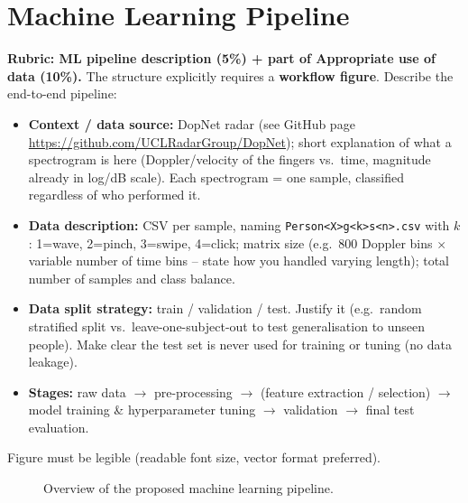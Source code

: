 \documentclass[10pt,a4paper,titlepage]{article}
\newcommand{\placeholder}[1]{\begin{placeholderbox}#1\end{placeholderbox}}
\begin{document}
\section{Machine Learning Pipeline}
\label{sec:pipeline}
\placeholder{%
\textbf{Rubric: ML pipeline description (5\%) + part of Appropriate use of
data (10\%).} The structure explicitly requires a \textbf{workflow figure}.
Describe the end-to-end pipeline:
\begin{itemize}
  \item \textbf{Context / data source:} DopNet radar (see GitHub page
        \url{https://github.com/UCLRadarGroup/DopNet}); short explanation of what
        a spectrogram is here (Doppler/velocity of the fingers vs.\ time,
        magnitude already in log/dB scale). Each spectrogram = one sample,
        classified regardless of who performed it.
  \item \textbf{Data description:} CSV per sample, naming
        \texttt{Person<X>g<k>s<n>.csv} with $k$: 1=wave, 2=pinch, 3=swipe,
        4=click; matrix size (e.g.\ 800 Doppler bins $\times$ variable number of
        time bins -- state how you handled varying length); total number of
        samples and class balance.
  \item \textbf{Data split strategy:} train / validation / test. Justify it
        (e.g.\ random stratified split vs.\ leave-one-subject-out to test
        generalisation to unseen people). Make clear the test set is never
        used for training or tuning (no data leakage).
  \item \textbf{Stages:} raw data $\rightarrow$ pre-processing $\rightarrow$
        (feature extraction / selection) $\rightarrow$ model training \&
        hyperparameter tuning $\rightarrow$ validation $\rightarrow$ final test
        evaluation.
\end{itemize}
Figure must be legible (readable font size, vector format preferred).}

\begin{figure}[h]
  \centering
  \caption{Overview of the proposed machine learning pipeline.}
  \label{fig:pipeline}
\end{figure}
\end{document}

